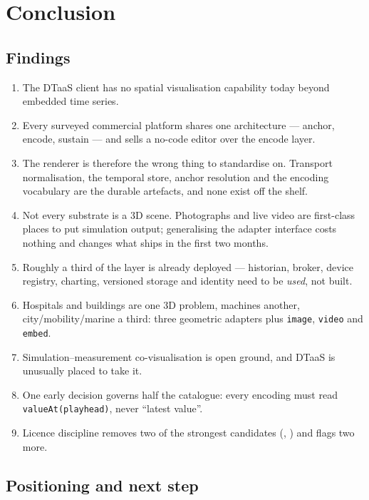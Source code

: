 \section{Conclusion}
\label{sec:conclusion}

\subsection{Findings}

\begin{enumerate}[itemsep=2pt]
  \item The DTaaS client has no spatial visualisation capability today beyond embedded
        time series.
  \item Every surveyed commercial platform shares one architecture --- anchor, encode,
        sustain --- and sells a no-code editor over the encode layer.
  \item The renderer is therefore the wrong thing to standardise on. Transport
        normalisation, the temporal store, anchor resolution and the encoding vocabulary
        are the durable artefacts, and none exist off the shelf.
  \item Not every substrate is a 3D scene. Photographs and live video are first-class
        places to put simulation output; generalising the adapter interface costs
        nothing and changes what ships in the first two months.
  \item Roughly a third of the layer is already deployed --- historian, broker, device
        registry, charting, versioned storage and identity need to be \emph{used}, not
        built.
  \item Hospitals and buildings are one 3D problem, machines another, city/mobility/marine
        a third: three geometric adapters plus \texttt{image}, \texttt{video} and
        \texttt{embed}.
  \item Simulation--measurement co-visualisation is open ground, and DTaaS is unusually
        placed to take it.
  \item One early decision governs half the catalogue: every encoding must read
        \texttt{valueAt(playhead)}, never ``latest value''.
  \item Licence discipline removes two of the strongest candidates
        (, ) and flags two more.
\end{enumerate}

\subsection{Positioning and next step}

